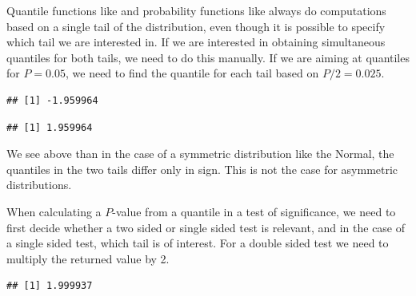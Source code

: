 \documentclass[krantz2]{krantz}\usepackage{knitr}%
\begin{document}
\begin{warningbox}
Quantile functions like  and probability functions like  always do computations based on a single tail of the distribution, even though it is possible to specify which tail we are interested in. If we are interested in obtaining simultaneous quantiles for both tails, we need to do this manually. If we are aiming at quantiles for $P = 0.05$, we need to find the quantile for each tail based on $P / 2 = 0.025$.

\begin{knitrout}\footnotesize
{}\color{fgcolor}\begin{kframe}
\begin{alltt}
\hlstd{(} \hlstd{=} \hlstd{,}  \hlstd{=} \hlstd{,}  \hlstd{=} \hlstd{)}
\end{alltt}
\begin{verbatim}
## [1] -1.959964
\end{verbatim}
\begin{alltt}
\hlstd{(} \hlstd{=} \hlstd{,}  \hlstd{=} \hlstd{,}  \hlstd{=} \hlstd{,}  \hlstd{=} \hlstd{)}
\end{alltt}
\begin{verbatim}
## [1] 1.959964
\end{verbatim}
\end{kframe}
\end{knitrout}

We see above than in the case of a symmetric distribution like the Normal, the quantiles in the two tails differ only in sign. This is not the case for asymmetric distributions.

When calculating a $P$-value from a quantile in a test of significance, we need to first decide whether a two sided or single sided test is relevant, and in the case of a single sided test, which tail is of interest. For a double sided test we need to multiply the returned value by 2.

\begin{knitrout}\footnotesize
{}\color{fgcolor}\begin{kframe}
\begin{alltt}
\hlstd{(} \hlstd{=} \hlstd{,}  \hlstd{=} \hlstd{,}  \hlstd{=} \hlstd{)} \hlopt{*} 
\end{alltt}
\begin{verbatim}
## [1] 1.999937
\end{verbatim}
\end{kframe}
\end{knitrout}

\end{warningbox}
\end{document}
